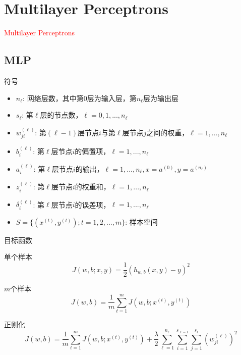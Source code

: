 \section{Multilayer Perceptrons}
\label{sec:mlp}

\begin{frame}
  \begin{center}
    \Huge{\textcolor{red}{Multilayer Perceptrons}}
  \end{center}
\end{frame}

\subsection{MLP}

\begin{frame}{符号}
 \begin{itemize}
   \item \alert{$ {n_{\ell}} $}: 网络层数，其中第$0$层为输入层，第$n_{\ell}$层为输出层
   \item \alert{$ {s_{\ell}} $}: 第$\ell$层的节点数，$ \ell = 0, 1, ..., n_{\ell} $
   \item \alert{$ w_{ji}^{(\ell)} $}: 第$(\ell-1)$层节点$i$与第$\ell$层节点$j$之间的权重，$ \ell = 1, ..., n_{\ell} $
   \item \alert{$ b_i^{(\ell)} $}: 第$\ell$层节点$i$的偏置项，$ \ell = 1, ..., n_{\ell} $
   \item \alert{$ a_i^{(\ell)} $}: 第$\ell$层节点$i$的输出，$ \ell = 1, ..., n_{\ell}, x = a^{(0)}, y = a^{(n_{\ell})} $
   \item \alert{$ z_i^{(\ell)} $}: 第$\ell$层节点$i$的权重和，$ \ell = 1, ..., n_{\ell} $
   \item \alert{$ \delta _i^{(\ell)} $}: 第$\ell$层节点$i$的误差项，$ \ell = 1, ..., n_{\ell} $
   \item \alert{$ S = \{ ({x^{(t)}},{y^{(t)}});t = 1,2,...,m\} $}: 样本空间
 \end{itemize}
\end{frame}

\begin{frame}{目标函数}
\begin{block}{单个样本}
\[J(w,b;x,y) = \frac{1}{2}{\left( {{h_{w,b}}(x,y) - y} \right)^2}\]
\end{block}

\begin{block}{$m$个样本}
\[J(w,b) = \frac{1}{m}\sum\limits_{t = 1}^m {J\left( {w,b;{x^{(t)}},{y^{(t)}}} \right)} \]
\end{block}

\begin{block}{正则化}
\[J(w,b) = \frac{1}{m}\sum\limits_{t = 1}^m {J\left( {w,b;{x^{(t)}},{y^{(t)}}} \right)}  + \frac{\lambda }{2}\sum\limits_{\ell  = 1}^{{n_\ell }} {\sum\limits_{i = 1}^{{s_{\ell  - 1}}} {\sum\limits_{j = 1}^{{s_\ell }} {{{\left( {w_{ji}^{(\ell )}} \right)}^2}} } } \]
\end{block}
\end{frame}

